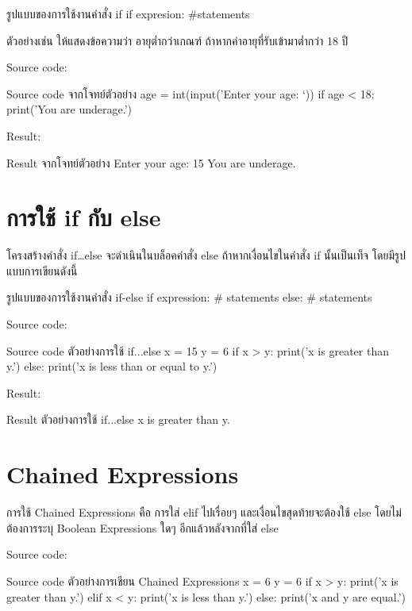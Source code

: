 \begin{codelist}{รูปแบบของการใช้งานคำสั่ง if}{}
if expresion:
    #statements
\end{codelist}

ตัวอย่างเช่น ให้แสดงข้อความว่า อายุต่ำกว่าเกณฑ์ ถ้าหากค่าอายุที่รับเข้ามาต่ำกว่า 18 ปี

Source code:
\begin{codelist}{Source code จากโจทย์ตัวอย่าง}{}
age = int(input('Enter your age: `))
if age < 18:
   print('You are underage.')
\end{codelist}

Result:
\begin{codelist}{Result จากโจทย์ตัวอย่าง}{}
Enter your age: 15
You are underage.
\end{codelist}


\section{การใช้ if กับ else}

โครงสร้างคำสั่ง if…else จะดำเนินในบล็อคคำสั่ง else ถ้าหากเงื่อนไขในคำสั่ง if นั้นเป็นเท็จ โดยมีรูปแบบการเขียนดังนี้

\begin{codelist}{รูปแบบของการใช้งานคำสั่ง if-else}{}
if expression:
    # statements
else:
    # statements
\end{codelist}

Source code:
\begin{codelist}{Source code ตัวอย่างการใช้ if...else}{}
x = 15
y = 6
if x > y: print('x is greater than y.')
else: print('x is less than or equal to y.')
\end{codelist}

Result:
\begin{codelist}{Result ตัวอย่างการใช้ if...else}{}
x is greater than y.
\end{codelist}


\section{Chained Expressions}

การใช้ Chained Expressions คือ การใส่ elif ไปเรื่อยๆ และเงื่อนไขสุดท้ายจะต้องใช้ else โดยไม่ต้องการระบุ Boolean Expressions ใดๆ อีกแล้วหลังจากที่ใส่ else

Source code:
\begin{codelist}{Source code ตัวอย่างการเขียน Chained Expressions}{}
x = 6
y = 6
if x > y: print('x is greater than y.')
elif x < y: print('x is less than y.')
else: print('x and y are equal.')
\end{codelist}

